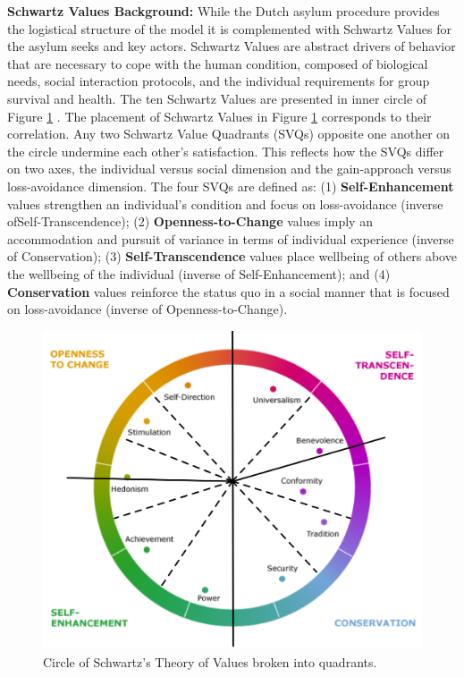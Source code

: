 \documentclass{scspaperproc}
\theoremstyle{scsthe}
\begin{document}
{\bf Schwartz Values Background:} While the Dutch asylum procedure provides the logistical structure of the model it is complemented with Schwartz Values for the asylum seeks and key actors. Schwartz Values are abstract drivers of behavior that are necessary to cope with the human condition, composed of biological needs, social interaction protocols, and the individual requirements for group survival and health. The ten Schwartz Values are presented in inner circle of Figure \ref{fig:val-circle} \cite{76}. The placement of Schwartz Values in Figure \ref{fig:val-circle} corresponds to their correlation. Any two Schwartz Value Quadrants (SVQs) opposite one another on the circle undermine each other's satisfaction. This reflects how the SVQs differ on two axes, the individual versus social dimension and the gain-approach versus loss-avoidance dimension. The four SVQs are defined as: (1) {\bf Self-Enhancement} values strengthen an individual's condition and focus on loss-avoidance (inverse ofSelf-Transcendence); (2)  {\bf Openness-to-Change} values imply an accommodation and pursuit of variance in terms of individual experience (inverse of Conservation); (3) {\bf Self-Transcendence} values place wellbeing of others above the wellbeing of the individual (inverse of Self-Enhancement); and (4) {\bf Conservation} values reinforce the status quo in a social manner that is focused on loss-avoidance (inverse of Openness-to-Change).

\begin{figure}[htb]
{
\centering
\includegraphics[width=0.45\columnwidth]{Color-Value-Circle.png}
\caption{Circle of Schwartz's Theory of Values broken into quadrants.}
\label{fig:val-circle}
}
\end{figure}
\end{document}
